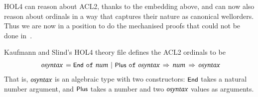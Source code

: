 \documentclass[11pt]{llncs}
\renewcommand{\HOLConst}[1]{{\textsf{\upshape\small #1}}}
\renewcommand{\HOLTyOp}[1]{\mbox{\fontencoding{T1}\fontfamily{bch}\fontseries{m}\fontshape{it}\fontsize{9.5}{10}\selectfont #1}}
\renewcommand{\HOLinline}[1]{\ensuremath{#1}}
\newenvironment{holmath}{\begin{displaymath}\begin{array}{l}}{\end{array}\end{displaymath}\ignorespacesafterend}
\begin{document}
HOL4 can reason about ACL2, thanks to the embedding above, and can now also reason about ordinals in a way that captures their nature as canonical wellorders.
Thus we are now in a position to do the mechanised proofs that could not be done in~\cite{KaufmannSlind:tphols09:ordinal-pearl,ManoliosVroon:JAR2006:ordinal-arithmetic}.

Kaufmann and Slind's HOL4 theory file defines the ACL2 ordinals to be
\begin{holmath}
\,\,\HOLTyOp{osyntax}\,= \HOLConst{End}\,\mbox{\texttt{\,of\,}}\,\HOLTyOp{num}\,\ensuremath{{\,\mid\,}}\,\HOLConst{Plus}\,\mbox{\texttt{\,of\,}}\,\HOLTyOp{osyntax}\,\HOLTokenImp{}\,\HOLTyOp{num}\,\HOLTokenImp{}\,\HOLTyOp{osyntax}
\end{holmath}
That is, \HOLinline{\HOLTyOp{osyntax}} is an algebraic type with two constructors: \HOLinline{\HOLConst{End}} takes a natural number argument, and \HOLinline{\HOLConst{Plus}} takes a number and two \HOLinline{\HOLTyOp{osyntax}} values as arguments.
\end{document}
